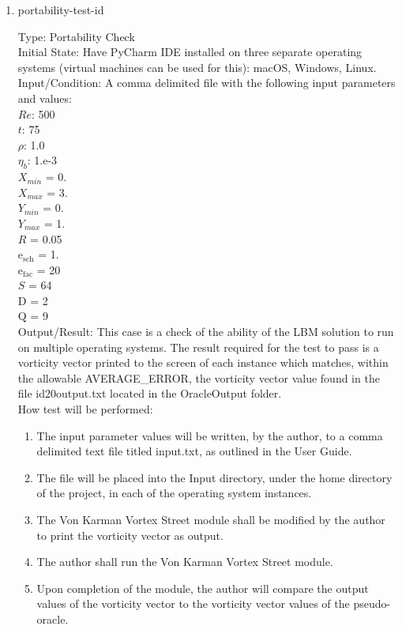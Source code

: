 \documentclass[12pt, titlepage]{article}
\newcounter{testcounter} %
\begin{document}
\begin{enumerate}

\item{portability-test-id\thetestcounter \\}

Type: Portability Check\\
					
Initial State: Have PyCharm IDE installed on three separate operating systems (virtual machines can be used for this): macOS, Windows, Linux. \\
					
Input/Condition: A comma delimited file with the following input parameters and values:\\
$Re$: 500\\
$t$: 75\\
$\rho$: 1.0\\
$\eta_b$: 1.e-3\\
$X_{min}$ = 0.\\
$X_{max}$ = 3.\\
$Y_{min}$ = 0.\\
$Y_{max}$ = 1.\\
$R$ = 0.05\\
$\mathrm{e_{sch}}$ = 1.\\
$\mathrm{e_{fac}}$ = 20\\
$S$ = 64\\
$\mathrm{D}$ = 2\\
$\mathrm{Q}$ = 9\\

					
Output/Result: This case is a check of the ability of the LBM solution to run on multiple operating systems. The result required for the test to pass is a vorticity vector printed to the screen of each instance which matches, within the allowable AVERAGE\_ERROR, the vorticity vector value found in the file id20output.txt located in the OracleOutput folder.\\
					
How test will be performed: 

\begin{enumerate}

\item The input parameter values will be written, by the author, to a comma delimited text file titled input.txt, as outlined in the User Guide.
\item The file will be placed into the Input directory, under the home directory of the project, in each of the operating system instances.
\item The Von Karman Vortex Street module shall be modified by the author to print the vorticity vector as output.
\item The author shall run the Von Karman Vortex Street module.
\item Upon completion of the module, the author will compare the output values of the vorticity vector to the vorticity vector values of the pseudo-oracle.\\
\end{enumerate}

\end{enumerate}
\end{document}
